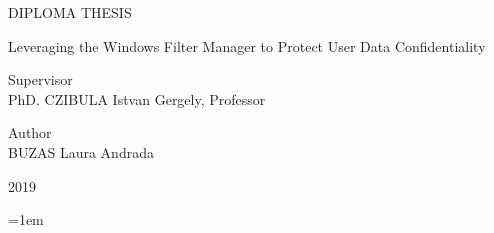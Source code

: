 \documentclass[12pt]{extreport}
\begin{document}
\begin{titlepage}
		\vfill
		
		\begin{center}
			{\LARGE DIPLOMA THESIS}
		\end{center}
		
		\begin{center}
			{\Huge Leveraging the Windows Filter Manager to Protect User Data Confidentiality}
		\end{center}
		
		\vfill
		
		\begin{flushleft}
			{\LARGE Supervisor \\ PhD. CZIBULA Istvan Gergely, Professor}
		\end{flushleft}
		
		\begin{flushright}
			{\Large Author \\ BUZAS Laura Andrada}
		\end{flushright}
		
		\vfill
		
		\begin{center}
			{\LARGE 2019}
		\end{center}
		
	\end{titlepage}
	\restoregeometry
	\pagestyle{plain}
	
	
	
	\tableofcontents
	\pagebreak
	
	
	
	
	
	
	
	
	\titleformat{\chapter}{}{}{0em}{\bfseries\LARGE}
	\nocite{*}
	\emergencystretch=1em
	\printbibliography[heading=bibintoc, title={}]
	
\end{document}
